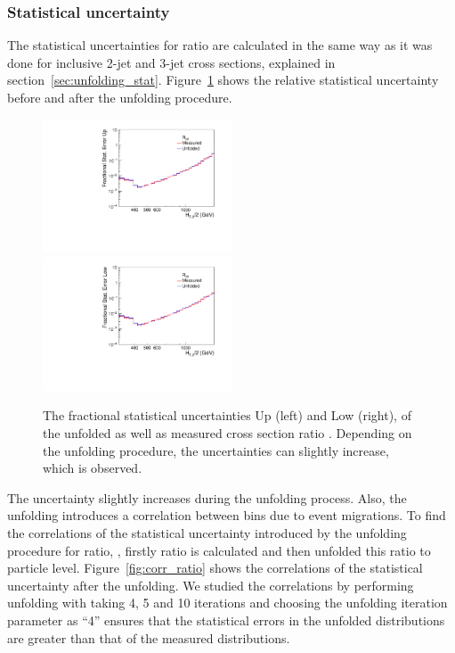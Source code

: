 \subsubsection{Statistical uncertainty}
\label{sec:unfolding_stat_ratio}
The statistical uncertainties for ratio \ratio are calculated in the same way as it was done for inclusive 2-jet and 3-jet cross sections, explained in section~\ref{sec:unfolding_stat}. Figure~\ref{fig:stat_unc_ratio} shows the relative statistical uncertainty before and after the unfolding procedure. 

\begin{figure}[!htbp]
  \begin{center}
    \includegraphics[width=0.5\textwidth]{Plots_HT_2_150/Comparison_stat_unc_ratio_32_up.pdf}%
    \includegraphics[width=0.5\textwidth]{Plots_HT_2_150/Comparison_stat_unc_ratio_32_down.pdf}\\
    \caption{The fractional statistical uncertainties Up (left) and Low (right), of the unfolded as well as measured cross section ratio \ratio. Depending on the unfolding procedure, the uncertainties can slightly increase, which is observed.}
    \label{fig:stat_unc_ratio}
  \end{center}
\end{figure}

The uncertainty slightly increases during the unfolding process. Also, the unfolding introduces a correlation between bins due to
event migrations. To find the correlations of the statistical uncertainty introduced by the unfolding procedure for ratio, \ratio, firstly 
ratio is calculated and then unfolded this ratio to particle level. Figure~\ref{fig:corr_ratio} shows the correlations of the statistical 
uncertainty after the unfolding. We studied the correlations by performing unfolding with taking 4, 5 and 10 iterations and choosing the 
unfolding iteration parameter as ``4'' ensures that the statistical errors in the unfolded distributions are greater than that of the 
measured distributions. 


